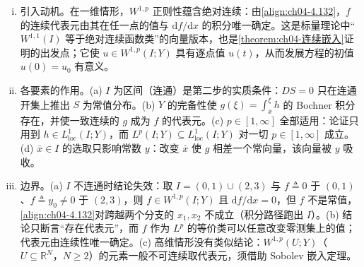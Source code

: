 \documentclass[../../main.tex]{subfiles}%
\begin{document}
\begin{remark}\label{remark:ch04-绝对连续代表动机}
\begin{enumerate}[(i)]
\item 引入动机。在一维情形，$W^{1,p}$ 正则性蕴含绝对连续：由\eqref{align:ch04-4.132}，$f$ 的连续代表元由其在任一点的值与 $\mathrm{d}f/\mathrm{d}x$ 的积分唯一确定。这是标量理论中“$W^{1,1}(I)$ 等于绝对连续函数类”的向量版本，也是\cref{theorem:ch04-连续嵌入}证明的出发点；它使 $u\in W^{1,p}(I;Y)$ 具有逐点值 $u(t)$，从而发展方程的初值 $u(0)=u_0$ 有意义。

\item 各要素的作用。(a) $I$ 为区间（连通）是第二步的实质条件：$DS=0$ 只在连通开集上推出 $S$ 为常值分布。(b) $Y$ 的完备性使 $g(\xi)=\int_{\bar x}^{\xi}h$ 的 Bochner 积分存在，并使一致连续的 $g$ 成为 $f$ 的代表元。(c) $p\in[1,\infty]$ 全部适用：论证只用到 $h\in L^1_{\mathrm{loc}}(I;Y)$，而 $L^p(I;Y)\subseteq L^1_{\mathrm{loc}}(I;Y)$ 对一切 $p\in[1,\infty]$ 成立。(d) $\bar x\in I$ 的选取只影响常数 $y$：改变 $\bar x$ 使 $g$ 相差一个常向量，该向量被 $y$ 吸收。

\item 边界。(a) $I$ 不连通时结论失效：取 $I=(0,1)\cup(2,3)$ 与 $f\triangleq0$ 于 $(0,1)$、$f\triangleq y_0\neq0$ 于 $(2,3)$，则 $f\in W^{1,p}(I;Y)$ 且 $\mathrm{d}f/\mathrm{d}x=0$，但 $f$ 不是常值，\eqref{align:ch04-4.132}对跨越两个分支的 $x_1,x_2$ 不成立（积分路径跑出 $I$）。(b) 结论只断言“存在代表元”，而 $f$ 作为 $L^p$ 的等价类可以任意改变零测集上的值；代表元由连续性唯一确定。(c) 高维情形没有类似结论：$W^{1,p}(U;Y)$（$U\subseteq\mathbb{R}^N$，$N\geqslant2$）的元素一般不可连续取代表元，须借助 Sobolev 嵌入定理。
\end{enumerate}
\end{remark}
\end{document}
